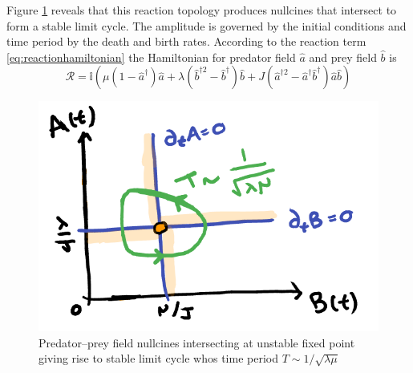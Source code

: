 \documentclass{article}[12pt]
\numberwithin{equation}{section}
\begin{document}
Figure \ref{fig:lotkavolterraspace} reveals that this reaction topology produces
nullcines that intersect to form a stable limit cycle. The amplitude is governed
by the initial conditions and time period by the death and birth rates. According
to the reaction term \eqref{eq:reactionhamiltonian} the Hamiltonian for predator
field $\hat a$ and prey field $\hat b$ is
\begin{equation}
	\mathcal{R}=\mathbb{i}
	\left(
		\mu (1-\hat a^\dagger)\hat a
		+ \lambda (\hat b^{\dagger2}-\hat b^\dagger)\hat b
		+ J (\hat a^{\dagger2}-\hat a^\dagger \hat b^\dagger) \hat a \hat b
	\right)
\end{equation}
\begin{figure}[H]
\centering{}
\captionsetup{justification=centering}
\includegraphics[scale=0.4]{figures/lotkavolterraspace}
\caption{Predator--prey field nullcines intersecting at unstable
fixed point\\ giving rise to stable limit cycle
whos time period $T\sim 1/\sqrt{\lambda\mu}$ }
\label{fig:lotkavolterraspace}
\end{figure}
\end{document}
